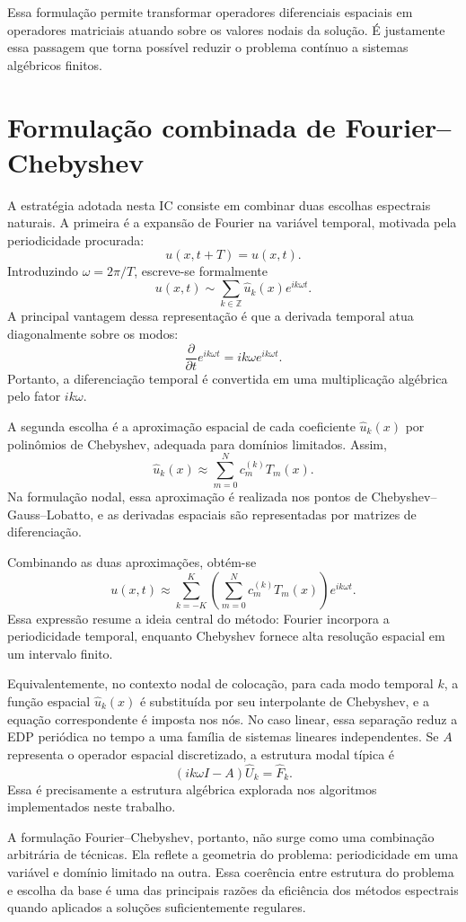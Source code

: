 Essa formulação permite transformar operadores diferenciais espaciais em operadores matriciais atuando sobre os valores nodais da solução. É justamente essa passagem que torna possível reduzir o problema contínuo a sistemas algébricos finitos.

\section{Formulação combinada de Fourier--Chebyshev}

A estratégia adotada nesta IC consiste em combinar duas escolhas espectrais naturais. A primeira é a expansão de Fourier na variável temporal, motivada pela periodicidade procurada:
\[
u(x,t+T)=u(x,t).
\]
Introduzindo \(\omega=2\pi/T\), escreve-se formalmente
\[
u(x,t)\sim \sum_{k\in\mathbb{Z}}\widehat{u}_k(x)e^{ik\omega t}.
\]
A principal vantagem dessa representação é que a derivada temporal atua diagonalmente sobre os modos:
\[
\frac{\partial}{\partial t}e^{ik\omega t}=ik\omega e^{ik\omega t}.
\]
Portanto, a diferenciação temporal é convertida em uma multiplicação algébrica pelo fator \(ik\omega\).

A segunda escolha é a aproximação espacial de cada coeficiente \(\widehat{u}_k(x)\) por polinômios de Chebyshev, adequada para domínios limitados. Assim,
\[
\widehat{u}_k(x)\approx \sum_{m=0}^{N}c_m^{(k)}T_m(x).
\]
Na formulação nodal, essa aproximação é realizada nos pontos de Chebyshev--Gauss--Lobatto, e as derivadas espaciais são representadas por matrizes de diferenciação.

Combinando as duas aproximações, obtém-se
\[
u(x,t)\approx \sum_{k=-K}^{K}\left(\sum_{m=0}^{N} c_m^{(k)}T_m(x)\right)e^{ik\omega t}.
\]
Essa expressão resume a ideia central do método: Fourier incorpora a periodicidade temporal, enquanto Chebyshev fornece alta resolução espacial em um intervalo finito.

Equivalentemente, no contexto nodal de colocação, para cada modo temporal \(k\), a função espacial \(\widehat{u}_k(x)\) é substituída por seu interpolante de Chebyshev, e a equação correspondente é imposta nos nós. No caso linear, essa separação reduz a EDP periódica no tempo a uma família de sistemas lineares independentes. Se \(A\) representa o operador espacial discretizado, a estrutura modal típica é
\[
(ik\omega I-A)\widehat{U}_k=\widehat{F}_k.
\]
Essa é precisamente a estrutura algébrica explorada nos algoritmos implementados neste trabalho.

A formulação Fourier--Chebyshev, portanto, não surge como uma combinação arbitrária de técnicas. Ela reflete a geometria do problema: periodicidade em uma variável e domínio limitado na outra. Essa coerência entre estrutura do problema e escolha da base é uma das principais razões da eficiência dos métodos espectrais quando aplicados a soluções suficientemente regulares.

